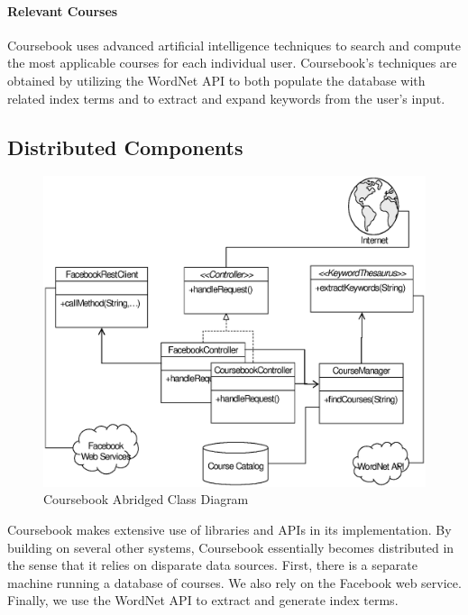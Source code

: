 \paragraph*{Relevant Courses}
Coursebook uses advanced artificial intelligence techniques to search and 
compute the most applicable courses for each individual user. Coursebook's
techniques are obtained by utilizing the WordNet API to both populate the
database with related index terms and to extract and expand keywords from the
user's input.

\subsection{Distributed Components}

\begin{figure}[t]
  \begin{center}
  \includegraphics[width=\textwidth]{images/classes}
  \caption{Coursebook Abridged Class Diagram}
  \label{fig:classes}
  \end{center}
\end{figure}

Coursebook makes extensive use of libraries and APIs in its implementation. By
building on several other systems, Coursebook essentially becomes distributed in
the sense that it relies on disparate data sources. First, there is a separate
machine running a database of courses. We also rely on the Facebook web service.
Finally, we use the WordNet API to extract and generate index terms.

